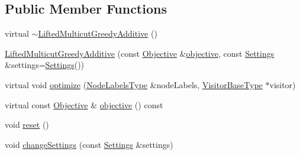 \subsection*{Public Member Functions}
\begin{DoxyCompactItemize}
\item 
virtual \hyperlink{classnifty_1_1graph_1_1lifted__multicut_1_1LiftedMulticutGreedyAdditive_a59b7bb2f1a4dfc0e92a651f3d515278d}{$\sim$\+Lifted\+Multicut\+Greedy\+Additive} ()
\item 
\hyperlink{classnifty_1_1graph_1_1lifted__multicut_1_1LiftedMulticutGreedyAdditive_a85a0ccc63efd9618cc5b85d4b4ada994}{Lifted\+Multicut\+Greedy\+Additive} (const \hyperlink{classnifty_1_1graph_1_1lifted__multicut_1_1LiftedMulticutGreedyAdditive_a964a91c5c0a4a6e7e08c2b321f0b6768}{Objective} \&\hyperlink{classnifty_1_1graph_1_1lifted__multicut_1_1LiftedMulticutGreedyAdditive_af2299ffe7e36e736089ed08b4a4cc963}{objective}, const \hyperlink{classnifty_1_1graph_1_1lifted__multicut_1_1LiftedMulticutGreedyAdditive_aaec19034ff79fb4ca939a44bf0b30bf3}{Settings} \&settings=\hyperlink{classnifty_1_1graph_1_1lifted__multicut_1_1LiftedMulticutGreedyAdditive_aaec19034ff79fb4ca939a44bf0b30bf3}{Settings}())
\item 
virtual void \hyperlink{classnifty_1_1graph_1_1lifted__multicut_1_1LiftedMulticutGreedyAdditive_acac1a5815e848e75380530ded427daac}{optimize} (\hyperlink{classnifty_1_1graph_1_1lifted__multicut_1_1LiftedMulticutGreedyAdditive_aeb295097f2ca8a7f9cf0770df94c17ab}{Node\+Labels\+Type} \&node\+Labels, \hyperlink{classnifty_1_1graph_1_1lifted__multicut_1_1LiftedMulticutGreedyAdditive_a3f18c0e6365fda786426a7ea03bc5847}{Visitor\+Base\+Type} $\ast$visitor)
\item 
virtual const \hyperlink{classnifty_1_1graph_1_1lifted__multicut_1_1LiftedMulticutGreedyAdditive_a964a91c5c0a4a6e7e08c2b321f0b6768}{Objective} \& \hyperlink{classnifty_1_1graph_1_1lifted__multicut_1_1LiftedMulticutGreedyAdditive_af2299ffe7e36e736089ed08b4a4cc963}{objective} () const 
\item 
void \hyperlink{classnifty_1_1graph_1_1lifted__multicut_1_1LiftedMulticutGreedyAdditive_aefd0415bfb31879684d3e9265b7b9820}{reset} ()
\item 
void \hyperlink{classnifty_1_1graph_1_1lifted__multicut_1_1LiftedMulticutGreedyAdditive_a82b83f1d4da62791360869c35ce95a46}{change\+Settings} (const \hyperlink{classnifty_1_1graph_1_1lifted__multicut_1_1LiftedMulticutGreedyAdditive_aaec19034ff79fb4ca939a44bf0b30bf3}{Settings} \&settings)
\item 

\end{DoxyCompactItemize}
